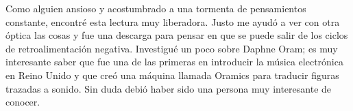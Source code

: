 Como alguien ansioso y acostumbrado a una tormenta de pensamientos constante, encontré esta lectura muy liberadora. Justo me ayudó a ver con otra
óptica las cosas y fue una descarga para pensar en que se puede salir de los ciclos de retroalimentación negativa. Investigué un poco sobre Daphne Oram; 
es muy interesante saber que fue una de las primeras en introducir la música electrónica en Reino Unido y que creó una máquina llamada Oramics para traducir
figuras trazadas a sonido. Sin duda debió haber sido una persona muy interesante de conocer.




\clearpage
